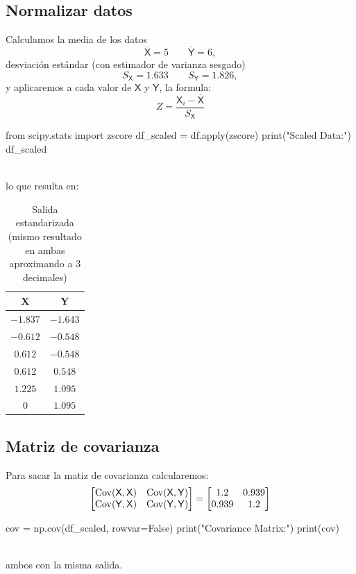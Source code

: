 \subsection{Normalizar datos}
\begin{minipage}[c]{0.48\textwidth}
Calculamos la media de los datos
\[ \overline{\mathsf{X}}=5 \qquad \overline{\mathsf{Y}}=6, \]
desviación estándar (con estimador de varianza sesgado)
\[ S_{\mathsf{X}}=1.633 \qquad S_{\mathsf{Y}}=1.826, \]
y aplicaremos a cada valor de $\mathsf{X}$ y $\mathsf{Y}$, la formula:
\[ Z=\frac{\mathsf{X}_i-\overline{\mathsf{X}}}{S_{\mathsf{X}}} \]
\end{minipage}
\hfill\vrule\hfill
\begin{minipage}[c]{0.48\textwidth}
\begin{jupyter}{3}
from scipy.stats import zscore
df_scaled = df.apply(zscore)
print("Scaled Data:")
df_scaled
\end{jupyter}
\end{minipage}\\

lo que resulta en:
\begin{table}[H]
\centering
\begin{tabular}{cc}
\sffamily X & \sffamily Y \\
\hline
\rowcolor[HTML]{EFEFEF} 
$-1.837$ & $-1.643$ \\
$-0.612$ & $-0.548$ \\
\rowcolor[HTML]{EFEFEF} 
$0.612$ & $-0.548$  \\
$0.612$ & $0.548$   \\
\rowcolor[HTML]{EFEFEF} 
$1.225$ & $1.095$   \\
$0$     & $1.095$
\end{tabular}
\caption{Salida estandarizada (mismo resultado en ambas aproximando a 3 decimales)}
\label{tab:PCAmath-standarized}
\end{table}

\subsection{Matriz de covarianza}
\begin{minipage}[c]{0.48\textwidth}
Para sacar la matiz de covarianza calcularemos:
\begin{equation*}
\begin{bmatrix}
\operatorname{Cov}(\mathsf{X},\mathsf{X}) & \operatorname{Cov}(\mathsf{X},\mathsf{Y})\\
\operatorname{Cov}(\mathsf{Y},\mathsf{X}) & \operatorname{Cov}(\mathsf{Y},\mathsf{Y})
\end{bmatrix}
=
\begin{bmatrix}
1.2 & 0.939\\
0.939 & 1.2
\end{bmatrix}
\end{equation*}
\end{minipage}
\hfill\vrule\hfill
\begin{minipage}[c]{0.48\textwidth}
\begin{jupyter}{4}
cov = np.cov(df_scaled, rowvar=False)
print("Covariance Matrix:")
print(cov)
\end{jupyter}
\end{minipage}\\
ambos con la misma salida.

